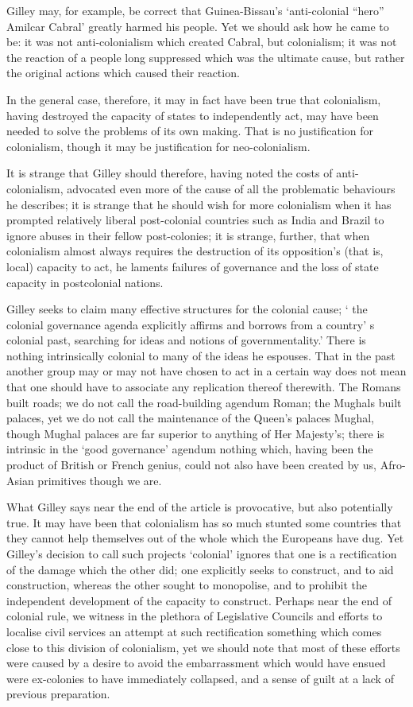 \begin{multicols}{2}
Gilley may, for example, be correct that Guinea-Bissau's `anti-colonial ``hero'' Amilcar Cabral' greatly harmed his people. Yet we should ask how he came to be: it was not anti-colonialism which created Cabral, but colonialism; it was not the reaction of a people long suppressed which was the ultimate cause, but rather the original actions which caused their reaction. 

In the general case, therefore, it may in fact have been true that colonialism, having destroyed the capacity of states to independently act, may have been needed to solve the problems of its own making. That is no justification for colonialism, though it may be justification for neo-colonialism.

It is strange that Gilley should therefore, having noted the costs of anti-colonialism, advocated even more of the cause of all the problematic behaviours he describes; it is strange that he should wish for more colonialism when it has prompted relatively liberal post-colonial countries such as India and Brazil to ignore abuses in their fellow post-colonies; it is strange, further, that when colonialism almost always requires the destruction of its opposition's (that is, local) capacity to act, he laments failures of governance and the loss of state capacity in postcolonial nations.

Gilley seeks to claim many effective structures for the colonial cause; ` the colonial governance agenda explicitly affirms and borrows from a country' s colonial past, searching for ideas and notions of governmentality.' There is nothing intrinsically colonial to many of the ideas he espouses. That in the past another group may or may not have chosen to act in a certain way does not mean that one should have to associate any replication thereof therewith. The Romans built roads; we do not call the road-building agendum Roman; the Mughals built palaces, yet we do not call the maintenance of the Queen's palaces Mughal, though Mughal palaces are far superior to anything of Her Majesty's; there is intrinsic in the `good governance' agendum nothing which, having been the product of British or French genius, could not also have been created by us, Afro-Asian primitives though we are.

What Gilley says near the end of the article is provocative, but also potentially true. It may have been that colonialism has so much stunted some countries that they cannot help themselves out of the whole which the Europeans have dug. Yet Gilley's decision to call such projects `colonial' ignores that one is a rectification of the damage which the other did; one explicitly seeks to construct, and to aid construction, whereas the other sought to monopolise, and to prohibit the independent development of the capacity to construct. Perhaps near the end of colonial rule, we witness in the plethora of Legislative Councils and efforts to localise civil services an attempt at such rectification something which comes close to this division of colonialism, yet we should note that most of these efforts were caused by a desire to avoid the embarrassment which would have ensued were ex-colonies to have immediately collapsed, and a sense of guilt at a lack of previous preparation. 


\end{multicols}
